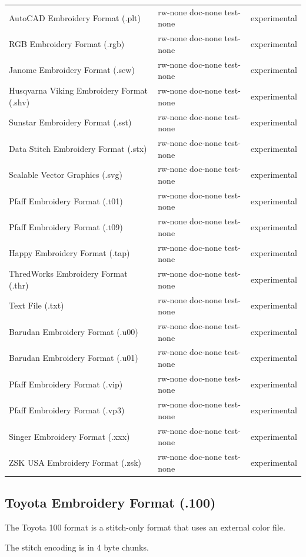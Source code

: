 \documentclass{report}
\begin{document}
\begin{longtable}{l l l}
AutoCAD Embroidery Format (.plt) & rw-none doc-none test-none & experimental \\
RGB Embroidery Format (.rgb) & rw-none doc-none test-none & experimental \\
Janome Embroidery Format (.sew) & rw-none doc-none test-none & experimental \\
Husqvarna Viking Embroidery Format (.shv) & rw-none doc-none test-none & experimental \\
Sunstar Embroidery Format (.sst) & rw-none doc-none test-none & experimental \\
Data Stitch Embroidery Format (.stx) & rw-none doc-none test-none & experimental \\
Scalable Vector Graphics (.svg) & rw-none doc-none test-none & experimental \\
Pfaff Embroidery Format (.t01) & rw-none doc-none test-none & experimental \\
Pfaff Embroidery Format (.t09) & rw-none doc-none test-none & experimental \\
Happy Embroidery Format (.tap) & rw-none doc-none test-none & experimental \\
ThredWorks Embroidery Format (.thr) & rw-none doc-none test-none & experimental \\
Text File (.txt) & rw-none doc-none test-none & experimental \\
Barudan Embroidery Format (.u00) & rw-none doc-none test-none & experimental \\
Barudan Embroidery Format (.u01) & rw-none doc-none test-none & experimental \\
Pfaff Embroidery Format (.vip) & rw-none doc-none test-none & experimental \\
Pfaff Embroidery Format (.vp3) & rw-none doc-none test-none & experimental \\
Singer Embroidery Format (.xxx) & rw-none doc-none test-none & experimental \\
ZSK USA Embroidery Format (.zsk) & rw-none doc-none test-none & experimental 
\end{longtable}

\subsection{Toyota Embroidery Format (.100)}

The Toyota 100 format is a stitch-only format that uses an external color file.

The stitch encoding is in 4 byte chunks.
\end{document}
